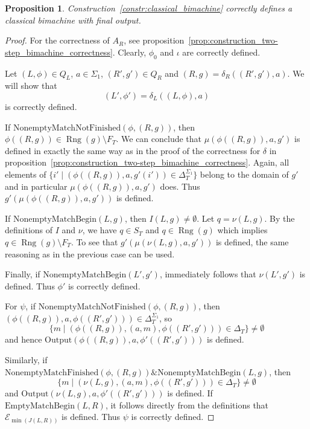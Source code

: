 \documentclass{article}
\newtheorem{proposition}[definition]{Proposition}
\DeclareMathOperator{\Rng}{Rng}
\begin{document}
	\begin{proposition} \label{prop:construction_classical_bimachine_correctness}
		Construction~\ref{constr:classical_bimachine} correctly defines a classical bimachine with final output.
	\end{proposition}
	\begin{proof}
		For the correctness of $A_R$, see proposition~\ref{prop:construction_two-step_bimachine_correctness}.
		Clearly, $\phi_0$ and $\iota$ are correctly defined.
		
		Let $(L, \phi)\in Q_L$, $a\in \Sigma_1$, $(R', g')\in Q_R$ and $(R, g) = \delta_R((R', g'), a)$. We will show that
		\[ (L', \phi') = \delta_L((L, \phi), a) \]
		is correctly defined.
		
		If $\mathrm{NonemptyMatchNotFinished}(\phi, (R, g))$, then $\phi((R,g))\in \Rng(g)\setminus F_T$.
		We can conclude that $\mu(\phi((R,g)), a, g')$ is defined in exactly the same way as in the proof of the correctness for $\delta$ in proposition~\ref{prop:construction_two-step_bimachine_correctness}.
		Again, all elements of $\{ i' \mid (\phi((R,g)), a, g'(i'))\in \Delta_T^{\Sigma_1} \}$ belong to the domain of $g'$ and in particular $\mu(\phi((R,g)), a, g')$ does. Thus $g'(\mu(\phi((R,g)), a, g'))$ is defined.
		
		If $\mathrm{NonemptyMatchBegin}(L, g)$, then $I(L, g)\ne\emptyset$. Let $q = \nu(L, g)$. By the definitions of $I$ and $\nu$, we have $q\in S_T$ and $q\in \Rng(g)$ which implies $q\in \Rng(g)\setminus F_T$. To see that $g'(\mu(\nu(L, g), a, g'))$ is defined, the same reasoning as in the previous case can be used.
		
		Finally, if $\mathrm{NonemptyMatchBegin}(L', g')$, immediately follows that $\nu(L', g')$ is defined. Thus $\phi'$ is correctly defined.
		
		For $\psi$, if $\mathrm{NonemptyMatchNotFinished}(\phi, (R, g))$, then $(\phi((R,g)), a, \phi((R',g')))\in \Delta_T^{\Sigma_1}$, so
		\[ \{ m\mid (\phi((R,g)), (a, m), \phi((R',g')))\in \Delta_T \}\ne\emptyset \]
		and hence $\mathrm{Output}(\phi((R,g)), a, \phi'((R',g')))$ is defined.
		
		Similarly, if $\mathrm{NonemptyMatchFinished}(\phi, (R, g)) \mathbin\& \mathrm{NonemptyMatchBegin}(L, g)$, then 
		\[ \{ m\mid (\nu(L, g), (a, m), \phi((R',g')))\in \Delta_T \}\ne\emptyset \]
		and $\mathrm{Output}(\nu(L, g), a, \phi'((R',g')))$ is defined.
		If $\mathrm{EmptyMatchBegin}(L, R)$, it follows directly from the definitions that $\mathcal{E}_{\min(J(L, R))}$ is defined.
		Thus $\psi$ is correctly defined.
	\end{proof}
\end{document}
